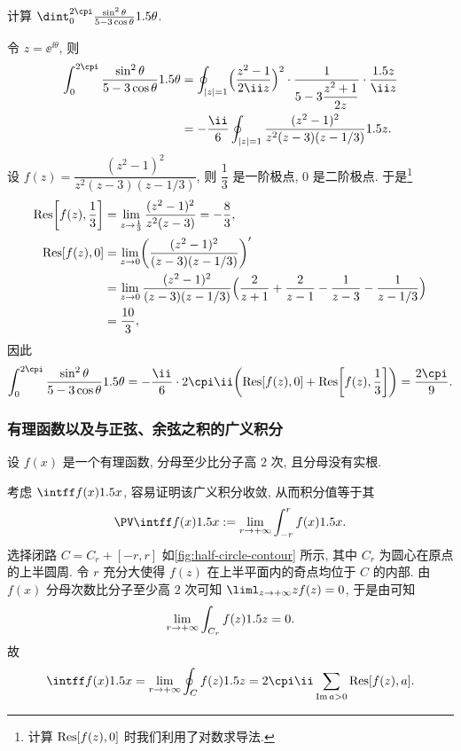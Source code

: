 \begin{example}
  计算 $\dint_0^{2\cpi}\frac{\sin^2\theta}{5-3\cos\theta}\d\theta$.
\end{example}

\begin{solution}
  令 $z=\ee^{\ii \theta}$, 则
  \begin{align*}
     \int_0^{2\cpi}\frac{\sin^2\theta}{5-3\cos\theta}\d\theta&
    =\oint_{\abs{z}=1}\Bigl(\frac{z^2-1}{2\ii z}\Bigr)^2\cdot
      \frac1{5-3\dfrac{z^2+1}{2z}}\cdot\frac{\d z}{\ii z}\\&
    =-\frac\ii6\oint_{\abs{z}=1}\frac{(z^2-1)^2}{z^2(z-3)(z-1/3)}\d z.
  \end{align*}
  设 $f(z)=\dfrac{(z^2-1)^2}{z^2(z-3)(z-1/3)}$, 则 $\dfrac13$ 是一阶极点, $0$ 是二阶极点.
  于是\footnote{
    计算 ${\mathrm{Res}}[f(z),0]$ 时我们利用了对数求导法.
  }
  \begin{align*}
     {\mathrm{Res}}\biggl[f(z),\frac13\biggr]&
    =\lim_{z\rightarrow \frac13}\frac{(z^2-1)^2}{z^2(z-3)}
    =-\frac83,\\
     {\mathrm{Res}}[f(z),0]&
    =\lim_{z\rightarrow 0}\biggl(\frac{(z^2-1)^2}{(z-3)(z-1/3)}\biggr)'\\&
    =\lim_{z\rightarrow 0}\frac{(z^2-1)^2}{(z-3)(z-1/3)}
      \Bigl(\frac2{z+1}+\frac2{z-1}-\frac1{z-3}-\frac1{z-1/3}\Bigr)\\&
    =\frac{10}3,
  \end{align*}
  因此
  \[
     \int_0^{2\cpi}\frac{\sin^2\theta}{5-3\cos\theta}\d\theta
    =-\frac\ii6\cdot 2\cpi\ii\biggl(\Res[f(z),0]+\Res\biggl[f(z),\frac13\biggr]\biggr)
    =\frac{2\cpi}9.
  \]
\end{solution}


\subsubsection{有理函数以及与正弦、余弦之积的广义积分}
\label{sssec:integral-rational-and-sin-cos}

设 $f(x)$ 是一个有理函数, 分母至少比分子高 $2$ 次, 且分母没有实根.

\smallskip
考虑 $\intff f(x)\d x$, 容易证明该广义积分收敛, 从而积分值等于其
\[
  \PV \intff f(x)\d x:=\lim_{r\ra+\infty}\int_{-r}^rf(x)\d x.
\]
选择闭路 $C=C_r+[-r,r]$ 如\ref{fig:half-circle-contour} 所示, 其中 $C_r$ 为圆心在原点的上半圆周.
令 $r$ 充分大使得 $f(z)$ 在上半平面内的奇点均位于 $C$ 的内部.
由 $f(x)$ 分母次数比分子至少高 $2$ 次可知 $\liml_{z\ra+\infty} zf(z)=0$, 于是由\thmSA 可知
\[
  \lim_{r\rightarrow +\infty} \int_{C_r} f(z)1.5 z=0.
\]
故
\[
   \intff f(x)\d x
  =\lim_{r\ra +\infty} \oint_C f(z)\d z
  =2\cpi\ii \sum_{\Im a>0} \Res[f(z),a].
\]

